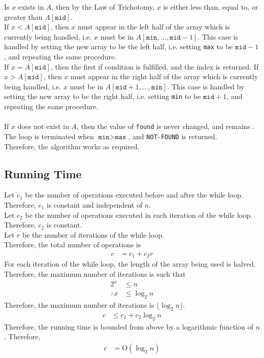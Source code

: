 \documentclass[titlepage, fleqn, a4paper, 12pt, twoside]{article}
\theoremstyle{definition}
\theoremstyle{theorem}
\begin{document}
Is $x$ exists in $A$, then by the Law of Trichotomy, $x$ is either less than, equal to, or greater than $A[\texttt{mid}]$.\\
If $x < A[\texttt{mid}]$, then $x$ must appear in the left half of the array which is currently being handled, i.e. $x$ must be in $A[\texttt{min},\dots,\texttt{mid} - 1]$.
This case is handled by setting the new array to be the left half, i.e. setting \texttt{max} to be $\texttt{mid} - 1$, and repeating the same procedure.\\
If $x = A[\texttt{mid}]$, then the first if condition is fulfilled, and the index is returned.
If $x > A[\texttt{mid}]$, then $x$ must appear in the right half of the array which is currently being handled, i.e. $x$ must be in $A[\texttt{mid} + 1,\dots,\texttt{min}]$.
This case is handled by setting the new array to be the right half, i.e. setting \texttt{min} to be $\texttt{mid} + 1$, and repeating the same procedure.\\
~\\
If $x$ does not exist in $A$, then the value of \texttt{found} is never changed, and remains \False.
The loop is terminated when $\texttt{min} > \texttt{max}$, and \texttt{NOT-FOUND} is returned.\\
Therefore, the algorithm works as required.

\subsection{Running Time}

Let $c_1$ be the number of operations executed before and after the while loop.
Therefore, $c_1$ is constant and independent of $n$.\\
Let $c_2$ be the number of operations executed in each iteration of the while loop.
Therefore, $c_2$ is constant.\\
Let $r$ be the number of iterations of the while loop.\\
Therefore, the total number of operations is
\begin{align*}
	c & = c_1 + c_2 r
\end{align*}
For each iteration of the while loop, the length of the array being used is halved.
Therefore, the maximum number of iterations is such that
\begin{align*}
	2^x          & \le n \\
	\therefore x & \le \log_2 n
\end{align*}
Therefore, the maximum number of iterations is $\lfloor\log_2 n\rfloor$.
\begin{align*}
	c & \le c_1 + c_2 \log_2 n
\end{align*}
Therefore, the running time is bounded from above by a logarithmic function of $n$.
Therefore,
\begin{align*}
	c & = \mathrm{O}(\log_2 n)
\end{align*}
\end{document}
